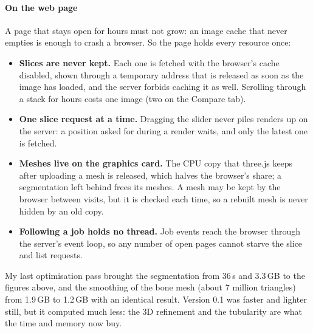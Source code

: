 \paragraph{On the web page} A page that stays open for hours must not grow: an image cache that never
empties is enough to crash a browser. So the page holds every resource once:
\begin{itemize}
  \item \textbf{Slices are never kept.} Each one is fetched with the browser's cache disabled, shown
        through a temporary  address that is released as soon as the image has loaded, and
        the server forbids caching it as well. Scrolling through a stack for hours costs one image (two on the Compare tab).
  \item \textbf{One slice request at a time.} Dragging the slider never piles renders up on the
        server: a position asked for during a render waits, and only the latest one is fetched.
  \item \textbf{Meshes live on the graphics card.} The CPU copy that three.js keeps after uploading a
        mesh is released, which halves the browser's share; a segmentation left behind frees its
        meshes. A mesh may be kept by the browser between visits, but it is checked each time, so a
        rebuilt mesh is never hidden by an old copy.
  \item \textbf{Following a job holds no thread.} Job events reach the browser through the server's
        event loop, so any number of open pages cannot starve the slice and list requests.
\end{itemize}

My last optimisation pass brought the segmentation from 36\,s and 3.3\,GB to the figures above, and the
smoothing of the bone mesh (about 7 million triangles) from 1.9\,GB to 1.2\,GB with an identical result.
Version 0.1 was faster and lighter still, but it computed much less: the 3D refinement and the
tubularity are what the time and memory now buy.
